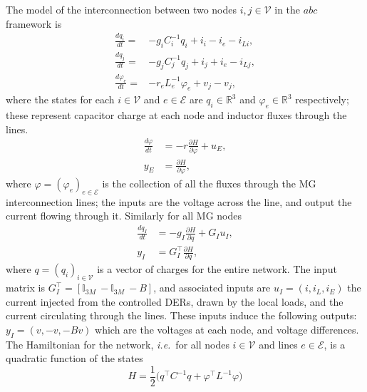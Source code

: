 \documentclass[journal, final, letterpaper]{IEEEtran}
\newcommand{\diff}[2]{{\frac{d #1}{d #2}}}
\newcommand{\pdiff}[2]{{\frac{\partial #1}{\partial #2}}}
\newcommand{\ie}{\emph{i.e.}\ }
\newcommand{\Rset}{\mathbb{R}}
\newcommand{\mc}{\mathcal}
\newcommand{\mbb}{\mathbb}
\begin{document}
The model of the interconnection between two nodes $i,j\in\mc{V}$ in the $abc$ framework is
%
\begin{subequations}
\begin{align}
\diff{q_i}{t} =& -g_i C_i^{-1}q_i + i_i - i_e -i_{Li},\label{eq:dyn_line_vi}\\
\diff{q_j}{t} =& -g_j C_j^{-1} q_j + i_j + i_e-i_{Lj},\label{eq:dyn_line_vj}\\
\diff{\varphi_e}{t} =& -r_e L_e^{-1} \varphi_e + v_j - v_j,\label{eq:dyn_line_ie}
\end{align}
\label{eq:dyn_line_abc}	
\end{subequations}
%
where the states for each $i\in\mc{V}$ and $e\in\mc{E}$ are $q_i\in\Rset^3$ and $\varphi_e\in\Rset^3$ respectively; these represent capacitor charge at each node and inductor fluxes through the lines. 
%
%
\begin{subequations}
\begin{align}
  \diff{\varphi }{t} & = -r \pdiff{H}{\varphi } + u_E,\label{eq:lines_pH_dyn}\\  
  y_E & = \pdiff{H}{\varphi },\label{eq:lines_pH_out}
\end{align}
\label{eq:lines_pH_model} 
\end{subequations}
%
where $\varphi  = (\varphi_e)_{e\in\mc{E}}$ is the collection of all the fluxes through the \ac{MG} interconnection lines; the inputs are the voltage across the line, and output the current flowing through it. Similarly for all \ac{MG} nodes
%
\begin{subequations}
\begin{align}
  \diff{q_{I}}{t} & = -g_{I}\pdiff{H}{q } + G_Iu_I,\label{eq:node_pH_dyn}\\  
  y_I & = G_I^\top\pdiff{H}{q },\label{eq:node_pH_out}
\end{align}
\label{eq:node_pH_model} 
\end{subequations}
%
where $q  = (q_i)_{i\in\mc{V}}$ is a vector of charges for the entire network. The input matrix is $G_I^\top = [\mbb{I}_{3M}~ -\mbb{I}_{3M}~ -B]$, and associated inputs are $u_I = (i ,i_L,i_E)$ the current injected from the controlled \ac{DER}s, drawn by the local loads, and the current circulating through the lines. These inputs induce the following outputs: $y_I = (v ,-v ,-Bv )$ which are the voltages at each node, and voltage differences. The Hamiltonian for the network, \ie for all nodes $i\in\mc{V}$ and lines $e\in\mc{E}$, is a quadratic function of the states 
%
\begin{equation}
  H = \frac{1}{2}\bigl ( q^\top C^{-1}q +\varphi^\top L^{-1}\varphi \bigr ) 
\label{eq:Hamiltonian_MG}  
\end{equation}
\end{document}

